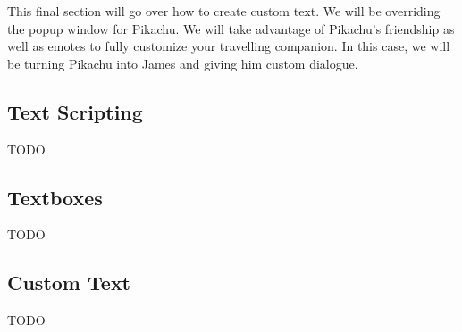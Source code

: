 \documentclass[../main.tex]{subfile}
\begin{document}
    This final section will go over how to create custom text.  We will be overriding the popup window for Pikachu.  We will take advantage of Pikachu's friendship as well as emotes to fully customize your travelling companion.  In this case, we will be turning Pikachu into James and giving him custom dialogue.

    \subsection{Text Scripting}
    TODO

    \subsection{Textboxes}
    TODO

    \subsection{Custom Text}
    TODO
\end{document}
